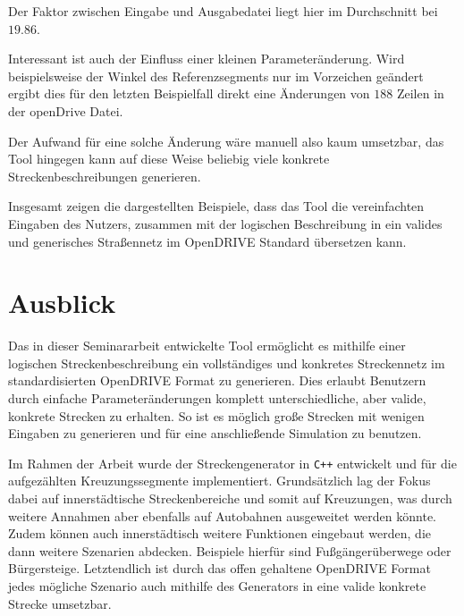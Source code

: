 Der Faktor zwischen Eingabe und Ausgabedatei liegt hier im Durchschnitt bei \(19.86\).

Interessant ist auch der Einfluss einer kleinen Parameteränderung. Wird beispielsweise der Winkel des Referenzsegments nur im Vorzeichen geändert ergibt dies für den letzten Beispielfall direkt eine Änderungen von \(188\) Zeilen in der openDrive Datei.

Der Aufwand für eine solche Änderung wäre manuell also kaum umsetzbar, das Tool hingegen kann auf diese Weise beliebig viele konkrete Streckenbeschreibungen generieren.

Insgesamt zeigen die dargestellten Beispiele, dass das Tool die vereinfachten Eingaben des Nutzers, zusammen mit der logischen Beschreibung in ein valides und generisches Straßennetz im OpenDRIVE Standard übersetzen kann.

\chapter{Ausblick}

Das in dieser Seminararbeit entwickelte Tool ermöglicht es mithilfe einer logischen Streckenbeschreibung ein vollständiges und konkretes Streckennetz im standardisierten OpenDRIVE Format zu generieren. Dies erlaubt Benutzern durch einfache Parameteränderungen komplett unterschiedliche, aber valide, konkrete Strecken zu erhalten. So ist es möglich große Strecken mit wenigen Eingaben zu generieren und für eine anschließende Simulation zu benutzen.

Im Rahmen der Arbeit wurde der Streckengenerator in \texttt{C++} entwickelt und für die aufgezählten Kreuzungssegmente implementiert. Grundsätzlich lag der Fokus dabei auf innerstädtische Streckenbereiche und somit auf Kreuzungen, was durch weitere Annahmen aber ebenfalls auf Autobahnen ausgeweitet werden könnte. Zudem können auch innerstädtisch weitere Funktionen eingebaut werden, die dann weitere Szenarien abdecken. Beispiele hierfür sind Fußgängerüberwege oder Bürgersteige. Letztendlich ist durch das offen gehaltene OpenDRIVE Format jedes mögliche Szenario auch mithilfe des Generators in eine valide konkrete Strecke umsetzbar.
